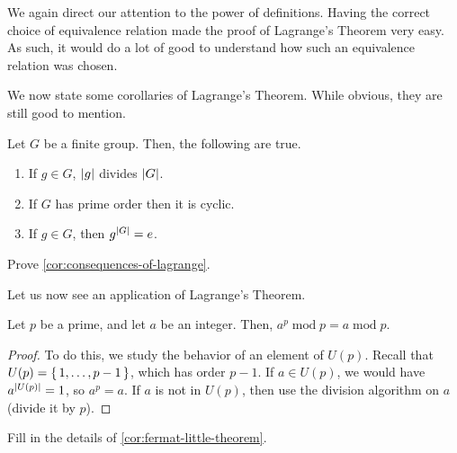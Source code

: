 \documentclass[./main.tex]{subfiles}
\begin{document}
We again direct our attention to the power of definitions. Having the correct
choice of equivalence relation made the proof of Lagrange's Theorem very easy.
As such, it would do a lot of good to understand how such an equivalence
relation was chosen.

We now state some corollaries of Lagrange's Theorem. While
obvious, they are still good to mention.
\begin{corollary}
\label{cor:consequences-of-lagrange}
    Let $G$ be a finite group. Then, the following are true.
    \begin{enumerate}
        \item If $g \in G$, $\abs{g}$ divides $\abs{G}$.
        \item If $G$ has prime order then it is cyclic.
        \item If $g \in G$, then $g^{\abs G} = e$.
    \end{enumerate}
\end{corollary}
\begin{exercise}
    Prove \cref{cor:consequences-of-lagrange}.
\end{exercise}

Let us now see an application of Lagrange's Theorem.

\begin{corollary}
\label{cor:fermat-little-theorem}
    Let $p$ be a prime, and let $a$ be an integer. Then, $a^p \operatorname{mod}
    p = a \operatorname{mod} p$.  
\end{corollary}
\begin{proof}
    To do this, we study the behavior of an element of $U(p)$. Recall that $U(p)
    = \set{1, \dots, p-1}$, which has order $p-1$. If $a \in U(p)$, we would
    have $a^{\abs{U(p)}} = 1$, so $a^p = a$. If $a$ is not in $U(p)$, then use
    the division algorithm on $a$ (divide it by $p$).
\end{proof}
\begin{exercise}
    Fill in the details of \cref{cor:fermat-little-theorem}.
\end{exercise}
\end{document}
